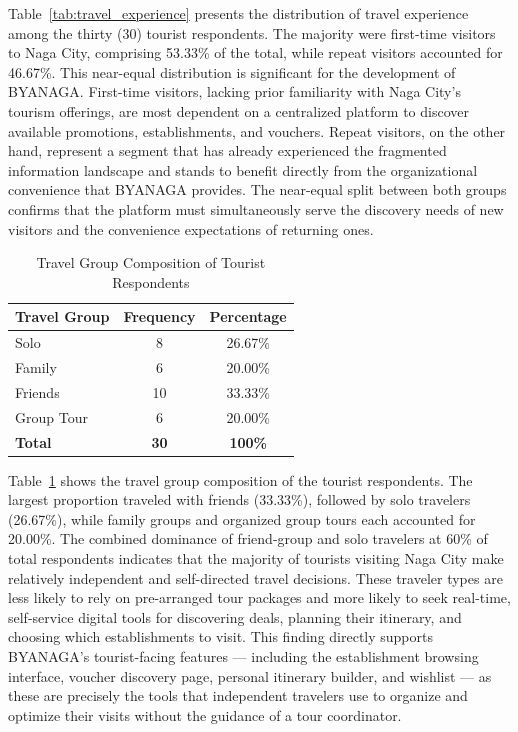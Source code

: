 \documentclass{research}
\begin{document}
Table~\ref{tab:travel_experience} presents the distribution of travel experience 
among the thirty (30) tourist respondents. The majority were first-time visitors 
to Naga City, comprising 53.33\% of the total, while repeat visitors accounted 
for 46.67\%. This near-equal distribution is significant for the development of 
BYANAGA. First-time visitors, lacking prior familiarity with Naga City's tourism 
offerings, are most dependent on a centralized platform to discover available 
promotions, establishments, and vouchers. Repeat visitors, on the other hand, 
represent a segment that has already experienced the fragmented information 
landscape and stands to benefit directly from the organizational convenience that 
BYANAGA provides. The near-equal split between both groups confirms that the 
platform must simultaneously serve the discovery needs of new visitors and the 
convenience expectations of returning ones.

\begin{table}[h]
    \centering
    \begin{tabular}{|l|c|c|}
        \hline
        \textbf{Travel Group} & \textbf{Frequency} & \textbf{Percentage} \\
        \hline
        Solo       & 8  & 26.67\% \\
        Family     & 6  & 20.00\% \\
        Friends    & 10 & 33.33\% \\
        Group Tour & 6  & 20.00\% \\
        \hline
        \textbf{Total} & \textbf{30} & \textbf{100\%} \\
        \hline
    \end{tabular}
    \caption{Travel Group Composition of Tourist Respondents}
    \label{tab:travel_group}
\end{table}

Table~\ref{tab:travel_group} shows the travel group composition of the tourist 
respondents. The largest proportion traveled with friends (33.33\%), followed 
by solo travelers (26.67\%), while family groups and organized group tours each 
accounted for 20.00\%. The combined dominance of friend-group and solo travelers 
at 60\% of total respondents indicates that the majority of tourists visiting Naga 
City make relatively independent and self-directed travel decisions. These traveler 
types are less likely to rely on pre-arranged tour packages and more likely to seek 
real-time, self-service digital tools for discovering deals, planning their itinerary, 
and choosing which establishments to visit. This finding directly supports 
BYANAGA's tourist-facing features — including the establishment browsing 
interface, voucher discovery page, personal itinerary builder, and wishlist — as 
these are precisely the tools that independent travelers use to organize and 
optimize their visits without the guidance of a tour coordinator.
\end{document}
